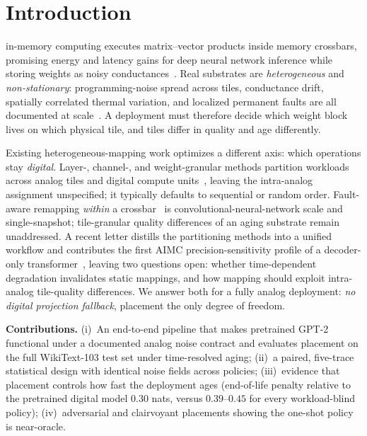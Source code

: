 \documentclass[journal]{IEEEtran}
\begin{document}
\section{Introduction}
 in-memory computing executes matrix--vector
products inside memory crossbars, promising energy and latency gains
for deep neural network inference while storing weights as noisy
conductances~\cite{joshi2020,rasch2023}. Real substrates are
\emph{heterogeneous} and \emph{non-stationary}: programming-noise spread
across tiles, conductance drift, spatially correlated thermal variation,
and localized permanent faults are all documented at
scale~\cite{joshi2020,legallo2018,wan2022}. A deployment must therefore
decide which weight block lives on which physical tile, and tiles differ
in quality and age differently.

Existing heterogeneous-mapping work optimizes a different axis: which
operations stay \emph{digital}. Layer-, channel-, and weight-granular
methods partition workloads across analog tiles and digital compute
units~\cite{lionheart,mps}, leaving the intra-analog assignment
unspecified; it typically defaults to sequential or random order.
Fault-aware remapping \emph{within} a crossbar~\cite{xia2018,zhang2019}
is convolutional-neural-network scale and single-snapshot;
tile-granular quality differences of an aging substrate remain
unaddressed. A recent letter
distills the partitioning methods into a unified workflow and
contributes the first AIMC precision-sensitivity profile of a
decoder-only transformer~\cite{lammie2026}, leaving two questions
open: whether time-dependent degradation invalidates static mappings,
and how mapping should exploit intra-analog tile-quality differences.
We answer both for a fully analog deployment: \emph{no digital
projection fallback}, placement the only degree of freedom.

\textbf{Contributions.}
(i)~An end-to-end pipeline that makes pretrained GPT-2 functional
under a documented analog noise contract and evaluates placement on the
full WikiText-103 test set under time-resolved aging;
(ii)~a paired, five-trace statistical design with identical noise
fields across policies; (iii)~evidence that placement controls how fast
the deployment ages (end-of-life penalty relative to the pretrained
digital model $0.30$ nats, versus $0.39$--$0.45$ for every
workload-blind policy); (iv)~adversarial and clairvoyant placements
showing the one-shot policy is near-oracle.

\end{document}
